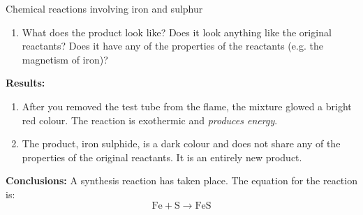 \begin{g_experiment}{Chemical reactions involving iron and sulphur }
\begin{enumerate}[noitemsep, label=\textbf{\arabic*}. ]
\label{m38709*uid24}\item What does the product look like? Does it look anything like the original reactants? Does it have any of the properties of the reactants (e.g. the magnetism of iron)?
\end{enumerate}
        \par 
        \label{m38709*eip-963}
	\par
      \label{m38709*id63554}\noindent{}\textbf{Results:}
          \newline
        \label{m38709*id63560}\begin{enumerate}[noitemsep, label=\textbf{\arabic*}. ] 
            \label{m38709*uid25}\item After you removed the test tube from the flame, the mixture glowed a bright red colour. The reaction is exothermic and \textsl{produces energy}.
\label{m38709*uid26}\item The product, iron sulphide, is a dark colour and does not share any of the properties of the original reactants. It is an entirely new product.
\end{enumerate}
        \par 
        \label{m38709*id63594}\noindent{}\textbf{Conclusions:}
          \newline
A synthesis reaction has taken place. The equation for the reaction is:
        \label{m38709*id63604}\nopagebreak\noindent{}
    \begin{equation}
    \mathrm{Fe}+\mathrm{S}\to \mathrm{FeS}\tag{12.6}
      \end{equation}
    \par 
\end{g_experiment}
\label{m38709*secfhsst!!!underscore!!!id294}
